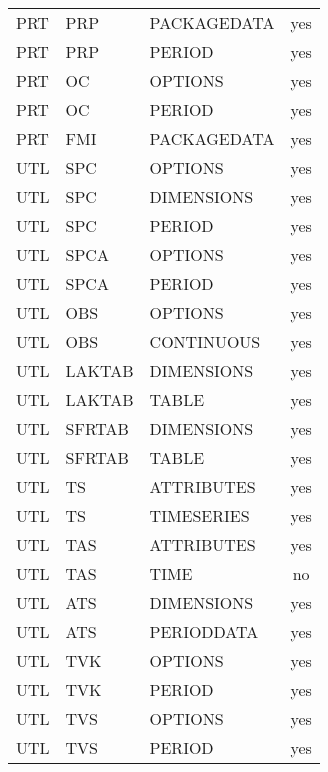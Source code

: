 \begin{longtable}{p{1.5cm} p{1.5cm} p{3cm} c}
PRT & PRP & PACKAGEDATA & yes \\ 
PRT & PRP & PERIOD & yes \\ 
\hline
PRT & OC & OPTIONS & yes \\ 
PRT & OC & PERIOD & yes \\ 
\hline
PRT & FMI & PACKAGEDATA & yes \\ 
\hline
UTL & SPC & OPTIONS & yes \\ 
UTL & SPC & DIMENSIONS & yes \\ 
UTL & SPC & PERIOD & yes \\ 
\hline
UTL & SPCA & OPTIONS & yes \\ 
UTL & SPCA & PERIOD & yes \\ 
\hline
UTL & OBS & OPTIONS & yes \\ 
UTL & OBS & CONTINUOUS & yes \\ 
\hline
UTL & LAKTAB & DIMENSIONS & yes \\ 
UTL & LAKTAB & TABLE & yes \\ 
\hline
UTL & SFRTAB & DIMENSIONS & yes \\ 
UTL & SFRTAB & TABLE & yes \\ 
\hline
UTL & TS & ATTRIBUTES & yes \\ 
UTL & TS & TIMESERIES & yes \\ 
\hline
UTL & TAS & ATTRIBUTES & yes \\ 
UTL & TAS & TIME & no \\ 
\hline
UTL & ATS & DIMENSIONS & yes \\ 
UTL & ATS & PERIODDATA & yes \\ 
\hline
UTL & TVK & OPTIONS & yes \\ 
UTL & TVK & PERIOD & yes \\ 
\hline
UTL & TVS & OPTIONS & yes \\ 
UTL & TVS & PERIOD & yes \\ 


\hline
\end{longtable}
\label{table:blocks}
\normalsize
